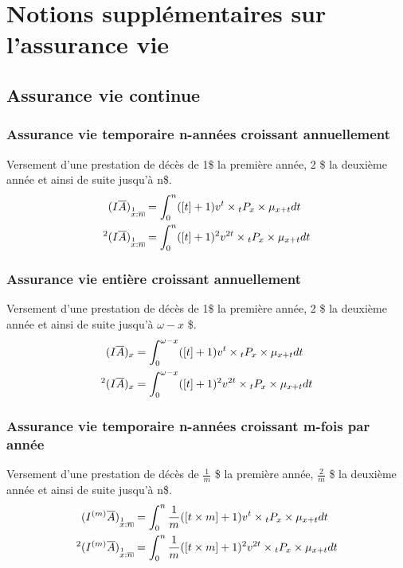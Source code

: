 \documentclass[11pt,french]{report}
\makeatletter
\DeclareRobustCommand{\annuity}[1]{%
\def\arraystretch{0}%
\setlength\arraycolsep{.7pt}%
\setlength\arrayrulewidth{.3pt}%
\begin{array}[b]{@{}c|}\hline
\\[\arraycolsep]%
\scriptstyle #1%
\end{array}%
}
\newcommand{\indiceGauche}[2]{{\vphantom{#2}}_{#1}#2}
\makeatother
\begin{document}
\chapter{Notions supplémentaires sur l'assurance vie}

\section{Assurance vie continue}

\subsection{Assurance vie  temporaire n-années croissant annuellement}
Versement d'une prestation de décès de 1\$ la première année, 2 \$ la deuxième année et ainsi de suite jusqu'à n\$.
\begin{align*}
(I\overline{A})_{\overset{1}{x}:\annuity{n}} &= \int_{0}^{n}([t] +1 )v^t \times \indiceGauche{t}{P}_{x} \times\mu_{x+t}dt \\
{}^2(I\overline{A})_{\overset{1}{x}:\annuity{n}} &= \int_{0}^{n}([t] +1 )^2v^{2t} \times \indiceGauche{t}{P}_{x}\times \mu_{x+t}dt \\
\end{align*}

\subsection{Assurance vie entière croissant annuellement}
Versement d'une prestation de décès de 1\$ la première année, 2 \$ la deuxième année et ainsi de suite jusqu'à $\omega - x$ \$.
\begin{align*}
(I\overline{A})_{x} &= \int_{0}^{\omega - x}([t] +1 )v^t \times \indiceGauche{t}{P}_{x}\times\mu_{x+t}dt \\
{}^2(I\overline{A})_{x} &= \int_{0}^{\omega - x}([t] +1 )^2v^{2t} \times \indiceGauche{t}{P}_{x} \times\mu_{x+t}dt \\
\end{align*}

\subsection{Assurance vie temporaire n-années croissant m-fois par année}
Versement d'une prestation de décès de $\frac{1}{m}$ \$ la première année, $\frac{2}{m}$ \$ la deuxième année et ainsi de suite jusqu'à n\$.
\begin{align*}
(I^{(m)}\overline{A})_{\overset{1}{x}:\annuity{n}} &= \int_{0}^{n}\frac{1}{m}([t\times m] +1 )v^t \times \indiceGauche{t}{P}_{x}\times \mu_{x+t}dt \\
{}^2(I^{(m)}\overline{A})_{\overset{1}{x}:\annuity{n}} &= \int_{0}^{n}\frac{1}{m}([t\times m] +1 )^2v^{2t} \times \indiceGauche{t}{P}_{x}\times \mu_{x+t}dt \\
\end{align*}
\end{document}
